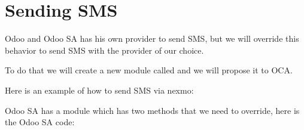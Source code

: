 \documentclass[letterpaper,10pt,english]{sphinxmanual}
\begin{document}
\section{Sending SMS}
\label{\detokenize{technical:sending-sms}}
Odoo and Odoo SA has his own provider to send SMS, but we will override this behavior to
send SMS with the provider of our choice.

To do that we will create a new module called  and we will propose it to OCA.

Here is an example of how to send SMS via nexmo:

\begin{sphinxVerbatim}[commandchars=\\\{\}]
   
   

   

     
     
     
\end{sphinxVerbatim}

Odoo SA has a module  which has two methods that we need to override, here is the Odoo SA code:
\end{document}
